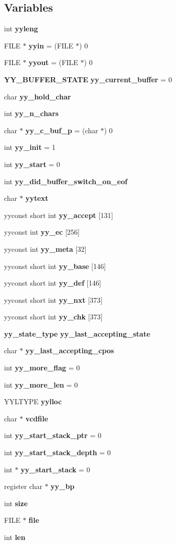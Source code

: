 \subsection*{Variables}
\begin{CompactItemize}
\item 
int {\bf yyleng}
\item 
FILE $\ast$ {\bf yyin} = (FILE $\ast$) 0
\item 
FILE $\ast$ {\bf yyout} = (FILE $\ast$) 0
\item 
{\bf YY\_\-BUFFER\_\-STATE} {\bf yy\_\-current\_\-buffer} = 0
\item 
char {\bf yy\_\-hold\_\-char}
\item 
int {\bf yy\_\-n\_\-chars}
\item 
char $\ast$ {\bf yy\_\-c\_\-buf\_\-p} = (char $\ast$) 0
\item 
int {\bf yy\_\-init} = 1
\item 
int {\bf yy\_\-start} = 0
\item 
int {\bf yy\_\-did\_\-buffer\_\-switch\_\-on\_\-eof}
\item 
char $\ast$ {\bf yytext}
\item 
yyconst short int {\bf yy\_\-accept} [131]
\item 
yyconst int {\bf yy\_\-ec} [256]
\item 
yyconst int {\bf yy\_\-meta} [32]
\item 
yyconst short int {\bf yy\_\-base} [146]
\item 
yyconst short int {\bf yy\_\-def} [146]
\item 
yyconst short int {\bf yy\_\-nxt} [373]
\item 
yyconst short int {\bf yy\_\-chk} [373]
\item 
{\bf yy\_\-state\_\-type} {\bf yy\_\-last\_\-accepting\_\-state}
\item 
char $\ast$ {\bf yy\_\-last\_\-accepting\_\-cpos}
\item 
int {\bf yy\_\-more\_\-flag} = 0
\item 
int {\bf yy\_\-more\_\-len} = 0
\item 
YYLTYPE {\bf yylloc}
\item 
char $\ast$ {\bf vcdfile}
\item 
int {\bf yy\_\-start\_\-stack\_\-ptr} = 0
\item 
int {\bf yy\_\-start\_\-stack\_\-depth} = 0
\item 
int $\ast$ {\bf yy\_\-start\_\-stack} = 0
\item 
register char $\ast$ {\bf yy\_\-bp}
\item 
int {\bf size}
\item 
FILE $\ast$ {\bf file}
\item 
int {\bf len}
\end{CompactItemize}


